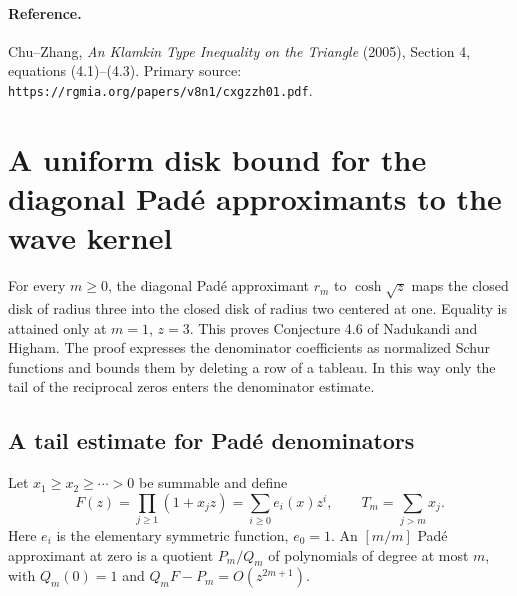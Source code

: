 \documentclass[11pt,a4paper]{article}
\numberwithin{equation}{section}
\theoremstyle{definition}
\theoremstyle{remark}
\newenvironment{sectionabstract}{\par\smallskip\begingroup\small\noindent}{\par\endgroup\medskip}
\begin{document}
\paragraph{Reference.} Chu--Zhang, \emph{An Klamkin Type Inequality on the Triangle} (2005), Section 4, equations (4.1)--(4.3). Primary source: \texttt{https://rgmia.org/papers/v8n1/cxgzzh01.pdf}.

\par\endgroup

\begingroup

\section{\texorpdfstring{A uniform disk bound for the diagonal Pad\'e approximants to the wave kernel}{A uniform disk bound for the diagonal Pad\'e approximants to the wave kernel}}\label{section:r39heisei}
\par\medskip

\begin{sectionabstract}
For every $m\ge0$, the diagonal Pad\'e approximant $r_m$ to $\cosh\sqrt z$ maps the closed disk of radius three into the closed disk of radius two centered at one. Equality is attained only at $m=1$, $z=3$. This proves Conjecture 4.6 of Nadukandi and Higham. The proof expresses the denominator coefficients as normalized Schur functions and bounds them by deleting a row of a tableau. In this way only the tail of the reciprocal zeros enters the denominator estimate.
\end{sectionabstract}

\subsection{A tail estimate for Pad\'e denominators}
Let $x_1\ge x_2\ge\cdots>0$ be summable and define
\[
 F(z)=\prod_{j\ge1}(1+x_jz)=\sum_{i\ge0}e_i(x)z^i,\qquad T_m=\sum_{j>m}x_j.
\]
Here $e_i$ is the elementary symmetric function, $e_0=1$. An $[m/m]$ Pad\'e approximant at zero is a quotient $P_m/Q_m$ of polynomials of degree at most $m$, with $Q_m(0)=1$ and $Q_mF-P_m=O(z^{2m+1})$.
\end{document}
